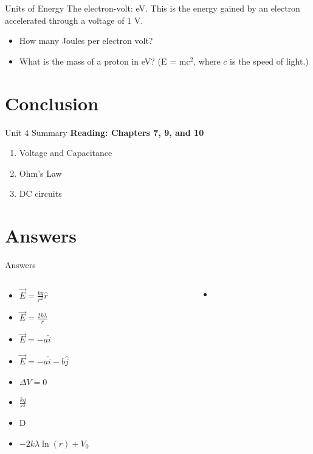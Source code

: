 \documentclass{beamer}
\begin{document}
\begin{frame}{Units of Energy}
The electron-volt: eV.  This is the energy gained by an electron accelerated through a voltage of 1 V.
\begin{itemize}
\item How many Joules per electron volt?
\item What is the mass of a proton in eV? (E = mc$^2$, where $c$ is the speed of light.)
\end{itemize}
\end{frame}

\section{Conclusion}

\begin{frame}{Unit 4 Summary}
\textbf{Reading: Chapters 7, 9, and 10}
\begin{enumerate}
\item \alert{Voltage and Capacitance}
\item Ohm's Law
\item DC circuits
\end{enumerate}
\end{frame}

\section{Answers}

\begin{frame}{Answers}
\tiny
\begin{columns}[T]
\begin{column}{0.5\textwidth}
\begin{itemize}
\item $\vec{E} = \frac{kq}{r^2}\hat{r}$
\item $\vec{E} = \frac{2k\lambda}{r}$
\item $\vec{E} = -a\hat{i}$
\item $\vec{E} = -a\hat{i}-b\hat{j}$
\item $\Delta V = 0$
\item $\frac{kq}{r^2}$
\item D
\item $-2k\lambda\ln(r) + V_0$
\end{itemize}
\end{column}
\begin{column}{0.5\textwidth}
\begin{itemize}
\item 
\end{itemize}
\end{column}
\end{columns}
\end{frame}
\end{document}
